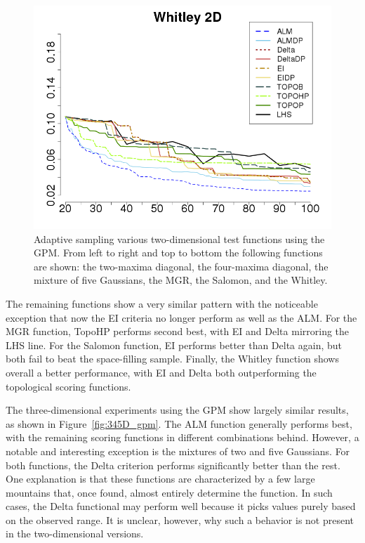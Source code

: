\begin{figure}[t]
\begin{center}
   \includegraphics[width=0.45\linewidth]{figs/chap5/gpm_Whitley_td=20}
   \caption{Adaptive sampling various two-dimensional test functions using the GPM. From left to right and top to bottom the following functions are shown: the two-maxima diagonal, the four-maxima diagonal, the mixture of five Gaussians, the MGR, the Salomon, and the Whitley.}
  \label{fig:2D_gpm_results}
  \end{center}
\end{figure}

The remaining functions show a very similar pattern with the noticeable exception that now the EI criteria no longer perform as well as the ALM.
%
For the MGR function, TopoHP performs second best, with EI and Delta mirroring the LHS line.
%
For the Salomon function, EI performs better than Delta again, but both fail to beat the space-filling sample.
%
Finally, the Whitley function shows overall a better performance, with EI and Delta both outperforming the topological scoring functions.

The three-dimensional experiments using the GPM show largely similar results, as shown in
Figure~\ref{fig:345D_gpm}.
%
The ALM function generally performs best, with the remaining scoring functions in different combinations behind.
%
However, a notable and interesting exception is the mixtures of two and five Gaussians.
%
For both functions, the Delta criterion performs significantly better than the rest.
%
One explanation is that these functions are characterized by a few large mountains
that, once found, almost entirely determine the function.
%
In such cases, the Delta functional may perform well because it picks values purely based on the observed range.
%
It is unclear, however, why such a behavior is not present in the two-dimensional versions.


